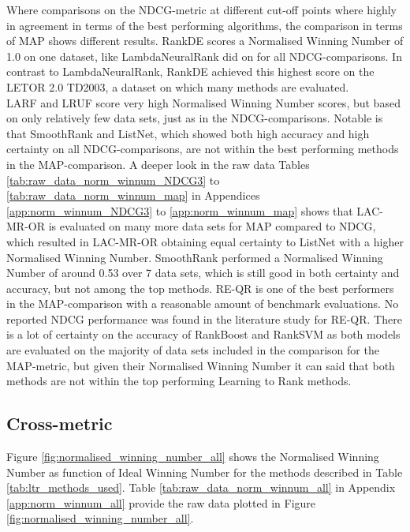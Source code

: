 Where comparisons on the \ac{NDCG}-metric at different cut-off points where highly in agreement in terms of the best performing algorithms, the comparison in terms of \ac{MAP} shows different results. RankDE scores a Normalised Winning Number of 1.0 on one dataset, like LambdaNeuralRank did on for all \ac{NDCG}-comparisons. In contrast to LambdaNeuralRank, RankDE achieved this highest score on the LETOR 2.0 TD2003, a dataset on which many methods are evaluated.\\

LARF and LRUF score very high Normalised Winning Number scores, but based on only relatively few data sets, just as in the \ac{NDCG}-comparisons. Notable is that SmoothRank and ListNet, which showed both high accuracy and high certainty on all \ac{NDCG}-comparisons, are not within the best performing methods in the \ac{MAP}-comparison. A deeper look in the raw data Tables \ref{tab:raw_data_norm_winnum_NDCG3} to \ref{tab:raw_data_norm_winnum_map} in Appendices \ref{app:norm_winnum_NDCG3} to \ref{app:norm_winnum_map} shows that LAC-MR-OR is evaluated on many more data sets for \ac{MAP} compared to \ac{NDCG}, which resulted in LAC-MR-OR obtaining equal certainty to ListNet with a higher Normalised Winning Number. SmoothRank performed a Normalised Winning Number of around 0.53 over 7 data sets, which is still good in both certainty and accuracy, but not among the top methods. RE-QR is one of the best performers in the \ac{MAP}-comparison with a reasonable amount of benchmark evaluations. No reported \ac{NDCG} performance was found in the literature study for RE-QR. There is a lot of certainty on the accuracy of RankBoost and Rank\ac{SVM} as both models are evaluated on the majority of data sets included in the comparison for the \ac{MAP}-metric, but given their Normalised Winning Number it can said that both methods are not within the top performing Learning to Rank methods.

\subsection{Cross-metric}
Figure \ref{fig:normalised_winning_number_all} shows the Normalised Winning Number as function of Ideal Winning Number for the methods described in Table \ref{tab:ltr_methods_used}. Table \ref{tab:raw_data_norm_winnum_all} in Appendix \ref{app:norm_winnum_all} provide the raw data plotted in Figure \ref{fig:normalised_winning_number_all}.\\

